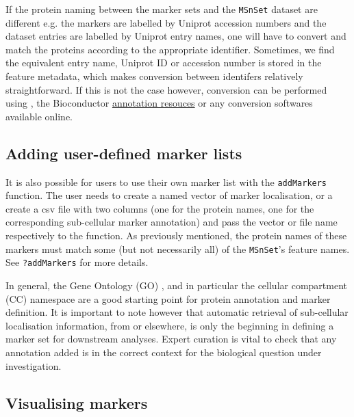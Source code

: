 If the protein naming between the marker sets and the \texttt{MSnSet}
dataset are different e.g. the markers are labelled by Uniprot
accession numbers and the dataset entries are labelled by Uniprot
entry names, one will have to convert and match the proteins according
to the appropriate identifier. Sometimes, we find the equivalent entry
name, Uniprot ID or accession number is stored in the feature
metadata, which makes conversion between identifers relatively
straightforward. If this is not the case however, conversion can be
performed using , the Bioconductor
\href{http://bioconductor.org/help/workflows/annotation/Annotation_Resources/}{annotation
  resouces} or any conversion softwares available online.

\subsection*{Adding user-defined marker lists}
It is also possible for users to use their own marker list with the
\texttt{addMarkers} function. The user needs to create a named vector
of marker localisation, or a create a csv file with two columns (one
for the protein names, one for the corresponding sub-cellular marker
annotation) and pass the vector or file name respectively to the
function. As previously mentioned, the protein names of these markers
must match some (but not necessarily all) of the \texttt{MSnSet}'s
feature names. See \texttt{?addMarkers} for more details.

In general, the Gene Ontology (GO) \cite{Ashburner:2000}, and in
particular the cellular compartment (CC) namespace are a good starting
point for protein annotation and marker definition. It is important to
note however that automatic retrieval of sub-cellular localisation
information, from  or elsewhere, is only the
beginning in defining a marker set for downstream analyses. Expert
curation is vital to check that any annotation added is in the correct
context for the biological question under investigation.


\subsection*{Visualising markers}

